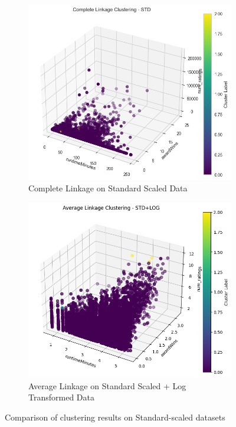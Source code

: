 \documentclass[10pt]{article}
\begin{document}
\begin{figure}[ht!]
    \centering
    \begin{subfigure}[b]{0.45\textwidth}
        \centering
        \includegraphics[width=\textwidth]{complink_std.png}
        \caption{Complete Linkage on Standard Scaled Data}
        \label{fig:img3}
    \end{subfigure}
    \hfill
    \begin{subfigure}[b]{0.45\textwidth}
        \centering
        \includegraphics[width=\textwidth]{avglink_STDLOG.png}
        \caption{Average Linkage on Standard Scaled + Log Transformed Data}
        \label{fig:img4}
    \end{subfigure}
    \caption{Comparison of clustering results on Standard-scaled datasets}
    \label{fig:confronto_STD}
\end{figure}
\end{document}
